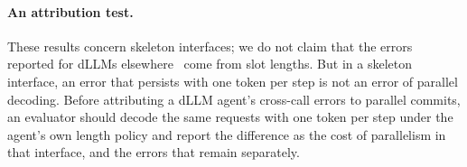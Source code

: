\paragraph{An attribution test.} These results concern skeleton interfaces; we do not claim that the errors reported for dLLMs elsewhere~\cite{lu2026bitter,kang2026parallelbench} come from slot lengths. But in a skeleton interface, an error that persists with one token per step is not an error of parallel decoding. Before attributing a dLLM agent's cross-call errors to parallel commits, an evaluator should decode the same requests with one token per step under the agent's own length policy and report the difference as the cost of parallelism in that interface, and the errors that remain separately.
